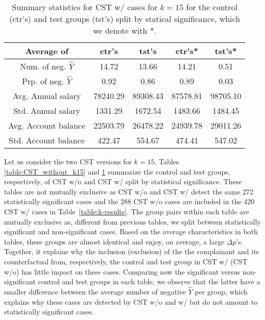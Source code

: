 %
\begin{table}[t]
\caption{Summary statistics for CST w/ cases for $k=15$ for the control (ctr’s) and test groups (tst’s) split by statical significance, which we denote with *.}
  \label{table:CST_with_k15}
  \centering
  \begin{tabular}{ccccc}
    \toprule
    Average of & ctr's & tst's & ctr's* & tst's* \\
    \midrule
    Num. of neg. $\hat{Y}$ & 14.72 & 13.66 & 14.21 & 0.51 \\
    Prp. of neg. $\hat{Y}$ & 0.92 & 0.86 & 0.89 & 0.03 \\
    Avg. Annual salary & 78240.29 & 89308.43 & 87578.81 & 98705.10 \\
    Std. Annual salary & 1331.29 & 1672.54 & 1483.66 & 1484.45 \\
    Avg. Account balance & 22503.79 & 26478.22 & 24939.78 & 29011.26 \\
    Std. Account balance & 422.47 & 554.67 & 474.41 & 547.02 \\
    \bottomrule
  \end{tabular}
\end{table}
%

Let us consider the two CST versions for $k=15$.
Tables \ref{table:CST_without_k15} and \ref{table:CST_with_k15} summarize the control and test groups, respectively, of CST w/o and CST w/ split by statistical significance.
%
These tables are not mutually exclusive as CST w/o and CST w/ detect the same 272 statistically significant cases and the 288 CST w/o cases are included in the 420 CST w/ cases in Table~\ref{table:k-results}. 
The group pairs within each table are mutually exclusive as, different from previous tables, we split between statistically significant and non-significant cases. 
%
Based on the average characteristics in both tables, these groups are almost identical and enjoy, on average, a large $\Delta p$'s. 
Together, it explains why the inclusion (exclusion) of the the complainant and its counterfactual from, respectively, the control and test group in CST w/ (CST w/o) has little impact on these cases.
%
Comparing now the significant versus non-significant control and test groups in each table, we observe that the latter have a smaller difference between the average number of negative $\hat{Y}$ per group, which explains why these cases are detected by CST w/o and w/ but do not amount to statistically significant cases.

